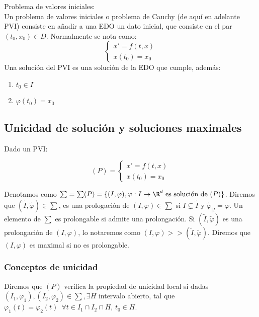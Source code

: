 \documentclass{article}
\begin{document}
\begin{definition} Problema de valores iniciales:\\
    Un problema de valores iniciales o problema de Cauchy (de aquí en adelante PVI)
    consiste en añadir a una EDO un dato inicial, que consiste en el par $(t_0, x_0) \in D$.
    Normalmente se nota como:
    \[
    \left\{
    \begin{array}{l}
        x' = f(t,x) \\
        x(t_0) = x_0
    \end{array}
    \right.
    \]
    Una solución del PVI es una solución de la EDO que cumple, además:
    \begin{enumerate}
        \item $t_0 \in I$
        \item $\varphi(t_0) = x_0$
    \end{enumerate}
\end{definition}

\subsection{Unicidad de solución y soluciones maximales}

Dado un PVI:

\[
(P) = \left\{
\begin{array}{l}
    x' = f(t,x) \\
    x(t_0) = x_0
\end{array}
\right.
\]

Denotamos como $\sum = \sum(P) = \{(I, \varphi), \varphi: I \to \R^d \text{ es solución
de } (P)\}$. Diremos que $(\tilde{I}, \tilde{\varphi}) \in \sum$, es una prologación
de $(I, \varphi) \in \sum$ si $I \subsetneq \tilde{I}$ y $\tilde{\varphi}_{|I} = \varphi$.
Un elemento de $\sum$ es prolongable si admite una prolongación. Si $(\tilde{I},
\tilde{\varphi})$ es una prolongación de $(I, \varphi)$, lo notaremos como $(I, \varphi)
>> (\tilde{I}, \tilde{\varphi})$. Diremos que $(I, \varphi)$ es maximal si no es
prolongable.

\subsubsection{Conceptos de unicidad}

Diremos que $(P)$ verifica la propiedad de unicidad local si dadas $(I_1, \varphi_1),
(I_2, \varphi_2) \in \sum, \exists H$ intervalo abierto, tal que $\varphi_1(t) =
\varphi_2(t)\,\,\, \forall t \in I_1 \cap I_2 \cap H$, $t_0 \in H$.\\
\end{document}
